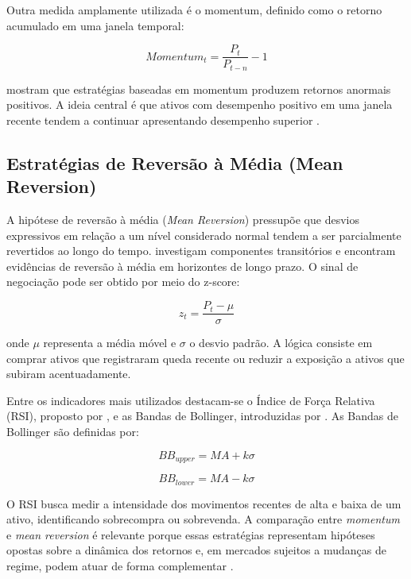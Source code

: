 \documentclass{eic-bcc-tcc}
\begin{document}
Outra medida amplamente utilizada é o momentum, definido como o retorno acumulado em uma janela temporal:

\begin{equation}
Momentum_t = \frac{P_t}{P_{t-n}} - 1
\end{equation}

\citet{JegadeeshTitman1993} mostram que estratégias baseadas em momentum produzem retornos anormais positivos. A ideia central é que ativos com desempenho positivo em uma janela recente tendem a continuar apresentando desempenho superior \citep{Moskowitz2012}.

\subsection{Estratégias de Reversão à Média (Mean Reversion)}

A hipótese de reversão à média (\textit{Mean Reversion}) pressupõe que desvios expressivos em relação a um nível considerado normal tendem a ser parcialmente revertidos ao longo do tempo. \citet{PoterbaSummers1988} investigam componentes transitórios e encontram evidências de reversão à média em horizontes de longo prazo. O sinal de negociação pode ser obtido por meio do z-score:

\begin{equation}
z_t = \frac{P_t - \mu}{\sigma}
\end{equation}

onde $\mu$ representa a média móvel e $\sigma$ o desvio padrão. A lógica consiste em comprar ativos que registraram queda recente ou reduzir a exposição a ativos que subiram acentuadamente.

Entre os indicadores mais utilizados destacam-se o Índice de Força Relativa (RSI), proposto por \citet{Wilder1978}, e as Bandas de Bollinger, introduzidas por \citet{Bollinger2001}. As Bandas de Bollinger são definidas por:

\begin{equation}
BB_{upper} = MA + k\sigma
\end{equation}

\begin{equation}
BB_{lower} = MA - k\sigma
\end{equation}

O RSI busca medir a intensidade dos movimentos recentes de alta e baixa de um ativo, identificando sobrecompra ou sobrevenda. A comparação entre \textit{momentum} e \textit{mean reversion} é relevante porque essas estratégias representam hipóteses opostas sobre a dinâmica dos retornos e, em mercados sujeitos a mudanças de regime, podem atuar de forma complementar \citep{JegadeeshTitman1993, PoterbaSummers1988, Moskowitz2012}.
\end{document}
